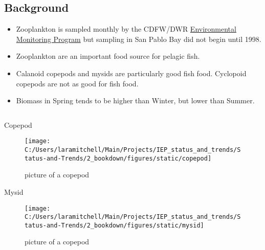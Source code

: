 \documentclass[
]{book}
\providecommand{\tightlist}{%
  \setlength{\itemsep}{0pt}\setlength{\parskip}{0pt}}
\begin{document}
\begin{columns-nocenter}

\begin{column}{0.7\textwidth}
\begin{column}

\hypertarget{background-3}{%
\subsection{Background}\label{background-3}}

\begin{itemize}
\tightlist
\item
  Zooplankton is sampled monthly by the CDFW/DWR \href{https://emp.baydeltalive.com/wiki/12297}{Environmental Monitoring Program} but sampling in San Pablo Bay did not begin until 1998.
\item
  Zooplankton are an important food source for pelagic fish.
\item
  Calanoid copepods and mysids are particularly good fish food. Cyclopoid copepods are not as good for fish food.
\item
  Biomass in Spring tends to be higher than Winter, but lower than Summer.
\end{itemize}

\end{column}
\end{column}

\begin{column}{0.3\textwidth}
\begin{column}

Copepod

\begin{figure}

{\centering \texttt{[image: C:/Users/laramitchell/Main/Projects/IEP\_status\_and\_trends/Status-and-Trends/2\_bookdown/figures/static/copepod]} 

}

\caption{picture of a copepod}\label{fig:unnamed-chunk-24}
\end{figure}

Mysid

\begin{figure}

{\centering \texttt{[image: C:/Users/laramitchell/Main/Projects/IEP\_status\_and\_trends/Status-and-Trends/2\_bookdown/figures/static/mysid]} 

}

\caption{picture of a copepod}\label{fig:unnamed-chunk-25}
\end{figure}

\end{column}
\end{column}

\end{columns-nocenter}
\end{document}
